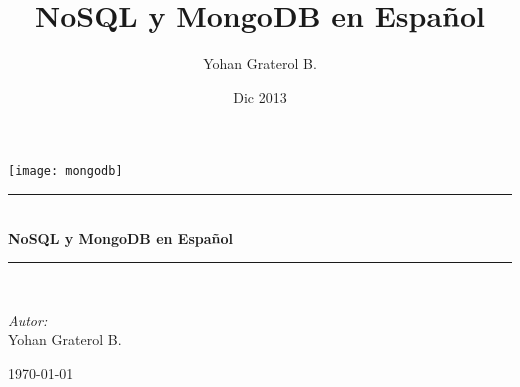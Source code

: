 \documentclass[a4paper, pdftex, 14pt, oneside, titlepage, openany, onecolumn]{book}
\newcommand{\HRule}{\rule{\linewidth}{0.5mm}}
\begin{document}
 
\pagestyle{fancy}
\renewcommand\headrulewidth{0pt}
\onehalfspace
\lhead{}

\author{Yohan Graterol B.}
\title{NoSQL y MongoDB en Español}
\date{Dic 2013}

\begin{titlepage}
	\begin{center}
		\texttt{[image: mongodb]}
		\HRule \\[0.4cm]
		{ \huge \bfseries NoSQL y MongoDB en Español \\[0.4cm] }

		\HRule \\[1.5cm]
		
		\begin{minipage}{0.4\textwidth}
			\begin{flushleft} \large
				\emph{Autor:}\\
				Yohan {Graterol B.}
			\end{flushleft}
		\end{minipage}
	    \begin{minipage}{0.4\textwidth}
			\begin{flushright} \large
			\end{flushright}
		\end{minipage}

		\vfill

		{\large \today}
	\end{center}
\end{titlepage}

\newpage
\mbox{}
\thispagestyle{empty} 

 
 

\tableofcontents







\backmatter
 

\printindex
\end{document}
